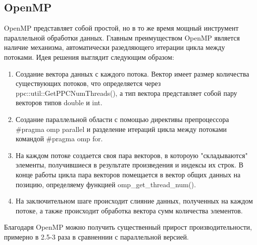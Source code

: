 \documentclass[12pt]{article}
\begin{document}
\subsection*{OpenMP}
OpenMP представляет собой простой, но в то же время мощный инструмент параллельной обработки данных. Главным преимуществом OpenMP является наличие механизма, автоматически разедляющего итерации цикла между потоками. Идея решения выглядит следующим образом:
\begin{enumerate}
    \item Создание вектора данных с каждого потока. Вектор имеет размер количества существующих потоков, что определяется через ppc::util::GetPPCNumThreads(), а тип вектора представляет собой пару векторов типов double и int.
    \item  Создание параллельной области с помощью директивы препроцессора \#pragma omp parallel и разделение итераций цикла между потоками командой \#pragma omp for.
    \item  На каждом потоке создается своя пара векторов, в котороую "складываются" элементы, получившиеся в результате произведения и индексы их строк. В конце работы цикла пара векторов помещается в вектор общих данных на позицию, определяему функцией omp\_get\_thread\_num().
    \item На заключительном шаге происходит слияние данных, полученных на каждом потоке, а также происходит обработка вектора сумм количества элементов.
\end{enumerate}

Благодаря OpenMP можно получить существенный прирост производительности, примерно в 2.5-3 раза в сравненнии с параллельной версией. \newpage
\end{document}
